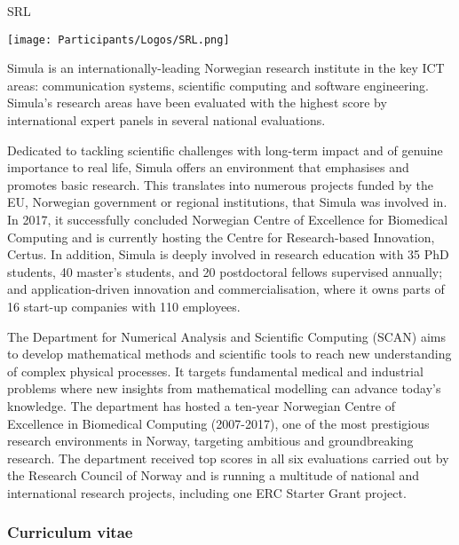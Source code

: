\begin{sitedescription}{SRL}

\begin{center}
\texttt{[image: Participants/Logos/SRL.png]}
\end{center}

Simula is an internationally-leading Norwegian research institute in the key
ICT areas: communication systems, scientific computing and software
engineering. Simula's research areas have been evaluated with the highest
score by international expert panels in several national evaluations.

Dedicated to tackling scientific challenges with long-term impact and of
genuine importance to real life, Simula offers an environment that emphasises
and promotes basic research. This translates into numerous projects funded by
the EU, Norwegian government or regional institutions, that Simula was
involved in. In 2017, it successfully concluded Norwegian Centre of Excellence
for Biomedical Computing and is currently hosting the Centre for
Research-based Innovation, Certus. In addition, Simula is deeply involved in
research education with 35 PhD students, 40 master's students, and 20
postdoctoral fellows supervised annually; and application-driven innovation
and commercialisation, where it owns parts of 16 start-up companies with 110
employees.

The Department for Numerical Analysis and Scientific Computing (SCAN) aims to
develop mathematical methods and scientific tools to reach new understanding
of complex physical processes. It targets fundamental medical and industrial
problems where new insights from mathematical modelling can advance today's
knowledge. The department has hosted a ten-year Norwegian Centre of Excellence
in Biomedical Computing (2007-2017), one of the most prestigious research
environments in Norway, targeting ambitious and groundbreaking research. The
department received top scores in all six evaluations carried out by the
Research Council of Norway and is running a multitude of national and
international research projects, including one ERC Starter Grant project.

\subsubsection*{Curriculum vitae}



% 


\end{sitedescription}
